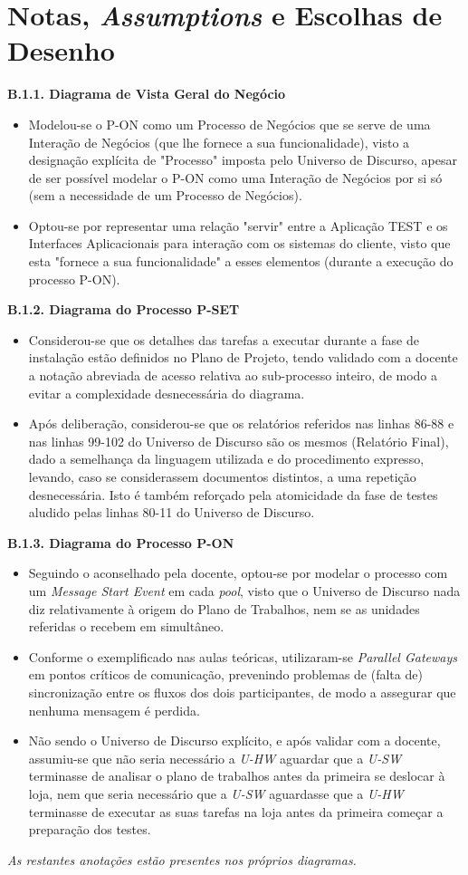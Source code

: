 \documentclass[12pt,a4paper]{article}
\begin{document}
\section*{Notas, \emph{Assumptions} e Escolhas de Desenho} \label{notes}
\normalsize
\textbf{B.1.1. Diagrama de Vista Geral do Negócio}
\begin{itemize}
	\item Modelou-se o P-ON como um Processo de Negócios que se serve de uma Interação de Negócios (que lhe fornece a sua funcionalidade), visto a designação explícita de "Processo" imposta pelo Universo de Discurso, apesar de ser possível modelar o P-ON como uma Interação de Negócios por si só (sem a necessidade de um Processo de Negócios).
	\item Optou-se por representar uma relação "servir" entre a Aplicação TEST e os Interfaces Aplicacionais para interação com os sistemas do cliente, visto que esta "fornece a sua funcionalidade" a esses elementos (durante a execução do processo P-ON).
\end{itemize}
\textbf{B.1.2. Diagrama do Processo P-SET}
\begin{itemize}
	\item Considerou-se que os detalhes das tarefas a executar durante a fase de instalação estão definidos no Plano de Projeto, tendo validado com a docente a notação abreviada de acesso relativa ao sub-processo inteiro, de modo a evitar a complexidade desnecessária do diagrama.
	\item Após deliberação, considerou-se que os relatórios referidos nas linhas 86-88 e nas linhas 99-102 do Universo de Discurso são os mesmos (Relatório Final), dado a semelhança da linguagem utilizada e do procedimento expresso, levando, caso se considerassem documentos distintos, a uma repetição desnecessária. Isto é também reforçado pela atomicidade da fase de testes aludido pelas linhas 80-11 do Universo de Discurso.
\end{itemize}
\textbf{B.1.3. Diagrama do Processo P-ON}
\begin{itemize}
	\item Seguindo o aconselhado pela docente, optou-se por modelar o processo com um \emph{Message Start Event} em cada \emph{pool}, visto que o Universo de Discurso nada diz relativamente à origem do Plano de Trabalhos, nem se as unidades referidas o recebem em simultâneo.
	\item Conforme o exemplificado nas aulas teóricas, utilizaram-se \emph{Parallel Gateways} em pontos críticos de comunicação, prevenindo problemas de (falta de) sincronização entre os fluxos dos dois participantes, de modo a assegurar que nenhuma mensagem é perdida.
	\item Não sendo o Universo de Discurso explícito, e após validar com a docente, assumiu-se que não seria necessário a \emph{U-HW} aguardar que a \emph{U-SW} terminasse de analisar o plano de trabalhos antes da primeira se deslocar à loja, nem que seria necessário que a \emph{U-SW} aguardasse que a \emph{U-HW} terminasse de executar as suas tarefas na loja antes da primeira começar a preparação dos testes.
\end{itemize}

\vfill

\emph{As restantes anotações estão presentes nos próprios diagramas.}

\vskip0.5cm
\end{document}
